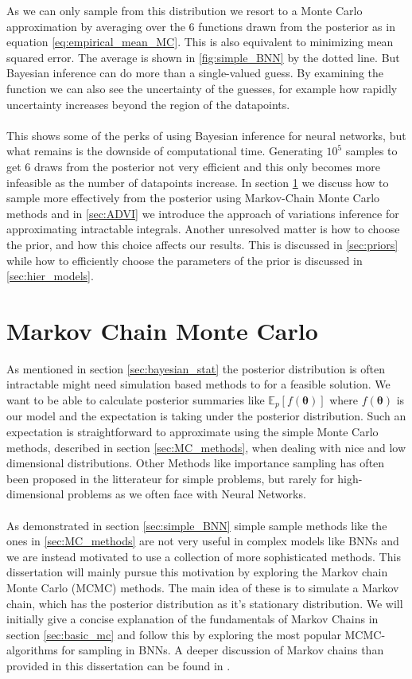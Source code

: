 As we can only sample from this distribution we resort to a Monte Carlo approximation by averaging over the 6 functions drawn from the posterior as in equation \ref{eq:empirical_mean_MC}. This is also equivalent to minimizing mean squared error. The average is shown in \ref{fig:simple_BNN} by the dotted line. But Bayesian inference can do more than a single-valued guess. By examining the function we can also see the uncertainty of the guesses, for example how rapidly uncertainty increases beyond the region of the datapoints. 
\\
\\
This shows some of the perks of using Bayesian inference for neural networks, but what remains is the downside of computational time. Generating $10^5$ samples to get 6 draws from the posterior not very efficient and this only becomes more infeasible as the number of datapoints increase. In section \ref{sec:MCMC} we discuss how to sample more effectively from the posterior using Markov-Chain Monte Carlo methods and in \ref{sec:ADVI} we introduce the approach of variations inference for approximating intractable integrals. Another unresolved matter is how to choose the prior, and how this choice affects our results. This is discussed in \ref{sec:priors} while how to efficiently choose the parameters of the prior is discussed in \ref{sec:hier_models}.



\section{Markov Chain Monte Carlo}\label{sec:MCMC}
 As mentioned in section \ref{sec:bayesian_stat} the posterior distribution is often intractable might need simulation based methods to for a feasible solution. We want to be able to calculate posterior summaries like $\mathbb{E}_p\left[f(\boldsymbol{\theta})\right]$ where $f(\boldsymbol{\theta})$ is our model and the expectation is taking under the posterior distribution. Such an expectation is straightforward to approximate using the simple Monte Carlo methods, described in section \ref{sec:MC_methods}, when dealing with nice and low dimensional distributions. Other Methods like importance sampling has often been proposed in the litterateur for simple problems, but rarely for high-dimensional problems as we often face with Neural Networks.
 \\
 \\
As demonstrated in section \ref{sec:simple_BNN} simple sample methods like the ones in \ref{sec:MC_methods} are not very useful in complex models like BNNs and we are instead motivated to use a collection of more sophisticated methods. This dissertation will mainly pursue this motivation by exploring the Markov chain Monte Carlo (MCMC) methods. The main idea of these is to simulate a Markov chain, which has the posterior distribution as it's stationary distribution. We will initially give a concise explanation of the fundamentals of Markov Chains in section \ref{sec:basic_mc} and follow this by exploring the most popular MCMC-algorithms for sampling in BNNs.
A deeper discussion of Markov chains than provided in this dissertation can be found in \cite{lawler2006introduction}.
 
